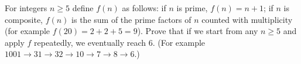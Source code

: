 For integers $n\ge5$ define $f(n)$ as follows: if $n$ is prime, $f(n)=n+1$; if $n$ is composite, $f(n)$ is the sum of the prime factors of $n$ counted with multiplicity (for example $f(20)=2+2+5=9$). Prove that if we start from any $n\ge5$ and apply $f$ repeatedly, we eventually reach $6$. (For example $1001\to31\to32\to10\to7\to8\to6$.)
